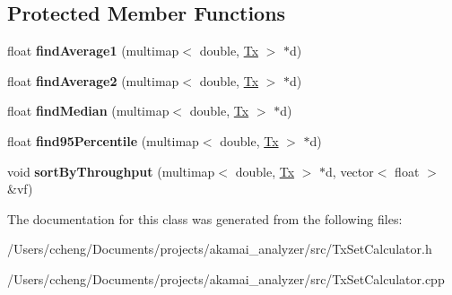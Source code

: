 \subsection*{Protected Member Functions}
\begin{DoxyCompactItemize}
\item 
\mbox{\label{class_tx_set_calculator_a16ca991998a5fdca338226bf879d5788}} 
float {\bfseries find\+Average1} (multimap$<$ double, \mbox{\hyperlink{struct_tx}{Tx}} $>$ $\ast$d)
\item 
\mbox{\label{class_tx_set_calculator_a5ef3c51425ea9a1273f1acf3adf14dc8}} 
float {\bfseries find\+Average2} (multimap$<$ double, \mbox{\hyperlink{struct_tx}{Tx}} $>$ $\ast$d)
\item 
\mbox{\label{class_tx_set_calculator_a9d422437269a44bdb51c02ca124233f5}} 
float {\bfseries find\+Median} (multimap$<$ double, \mbox{\hyperlink{struct_tx}{Tx}} $>$ $\ast$d)
\item 
\mbox{\label{class_tx_set_calculator_a91cdd19c13fd6f3ac7c4070788331914}} 
float {\bfseries find95\+Percentile} (multimap$<$ double, \mbox{\hyperlink{struct_tx}{Tx}} $>$ $\ast$d)
\item 
\mbox{\label{class_tx_set_calculator_ae88bf5fa253dcc22faff26895025c5f4}} 
void {\bfseries sort\+By\+Throughput} (multimap$<$ double, \mbox{\hyperlink{struct_tx}{Tx}} $>$ $\ast$d, vector$<$ float $>$ \&vf)
\end{DoxyCompactItemize}


The documentation for this class was generated from the following files\+:\begin{DoxyCompactItemize}
\item 
/\+Users/ccheng/\+Documents/projects/akamai\+\_\+analyzer/src/Tx\+Set\+Calculator.\+h\item 
/\+Users/ccheng/\+Documents/projects/akamai\+\_\+analyzer/src/Tx\+Set\+Calculator.\+cpp\end{DoxyCompactItemize}
